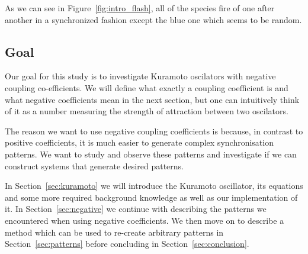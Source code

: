 As we can see in Figure~\ref{fig:intro_flash}, all of the species fire of one after another in a synchronized fashion except the blue one which seems to be random. 

\subsection{Goal}
Our goal for this study is to investigate Kuramoto oscilators with negative coupling co-efficients. We will define what exactly a coupling coefficient is and what negative coefficients mean in the next section, but one can intuitively think of it as a number measuring the strength of attraction between two oscilators. 

The reason we want to use negative coupling coefficients is because, in contrast to positive coefficients, it is much easier to generate complex synchronisation patterns. We want to study and observe these patterns and investigate if we can construct systems that generate desired patterns. 

In Section~\ref{sec:kuramoto} we will introduce the Kuramoto oscillator, its equations and some more required background knowledge as well as our implementation of it. In Section~\ref{sec:negative} we continue with describing the patterns we encountered when using negative coefficients. We then move on to describe a method which can be used to re-create arbitrary patterns in Section~\ref{sec:patterns} before concluding in Section~\ref{sec:conclusion}. 


